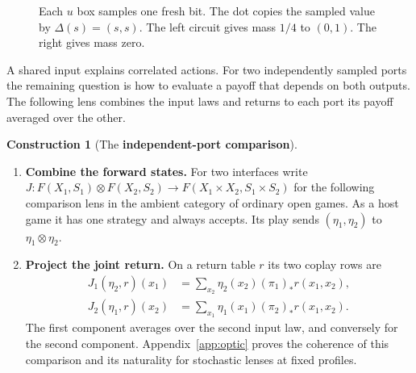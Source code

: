 \documentclass[11pt,a4paper]{article}
\theoremstyle{definition}
\newtheorem*{construction}{Construction}
\begin{document}
\begin{figure}[!htbp]
    \centering\small
    \caption{Each $u$ box samples one fresh bit. The dot copies the sampled value by $\Delta(s)=(s,s)$. The left circuit gives mass $1/4$ to $(0,1)$. The right gives mass zero.}\label{fig:signal}
\end{figure}

A shared input explains correlated actions. For two independently sampled ports the remaining question is how to evaluate a payoff that depends on both outputs. The following lens combines the input laws and returns to each port its payoff averaged over the other.

\begin{construction}[The \textbf{independent-port comparison}]\leavevmode
    \begin{enumerate}[titledsteps]
        \item \textbf{Combine the forward states.} For two interfaces write $J:F(X_1,S_1)\otimes F(X_2,S_2)\to F(X_1\times X_2,S_1\times S_2)$ for the following comparison lens in the ambient category of ordinary open games. As a host game it has one strategy and always accepts. Its play sends $(\eta_1,\eta_2)$ to $\eta_1\otimes\eta_2$.

        \item \textbf{Project the joint return.} On a return table $r$ its two coplay rows are
        \begin{align}
            J_1(\eta_2,r)(x_1)
            &=\sum_{x_2}\eta_2(x_2)(\pi_1)_*r(x_1,x_2),\nonumber\\
            J_2(\eta_1,r)(x_2)
            &=\sum_{x_1}\eta_1(x_1)(\pi_2)_*r(x_1,x_2).
            \label{eq:bundle}
        \end{align}
        The first component averages over the second input law, and conversely for the second component. Appendix~\ref{app:optic} proves the coherence of this comparison and its naturality for stochastic lenses at fixed profiles.
    \end{enumerate}
\end{construction}
\end{document}
